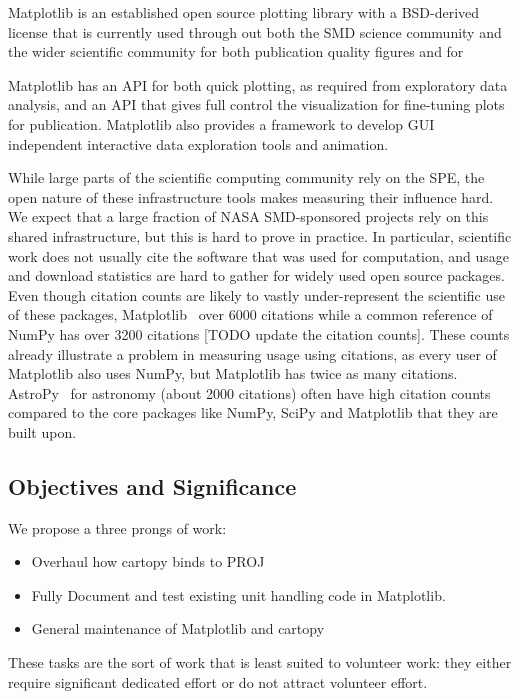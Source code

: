 \documentclass[12pt]{article}
\numberwithin{page}{section}
\begin{document}
Matplotlib \cite{Hunter:2007} is an established open source plotting
library with a BSD-derived license that is currently used through out
both the SMD science community and the wider scientific community for
both publication quality figures and for

Matplotlib has an API for both quick plotting, as required from
exploratory data analysis, and an API that gives full control the
visualization for fine-tuning plots for publication.  Matplotlib also
provides a framework to develop GUI independent interactive data
exploration tools and animation.

While large parts of the scientific computing community rely on the
SPE, the open nature of these infrastructure tools makes measuring
their influence hard.  We expect that a large fraction of NASA
SMD-sponsored projects rely on this shared infrastructure, but this is
hard to prove in practice.  In particular, scientific work does not
usually cite the software that was used for computation, and usage and
download statistics are hard to gather for widely used open source
packages.  Even though citation counts are likely to vastly
under-represent the scientific use of these packages,
Matplotlib~\cite{Hunter:2007} over 6000 citations while a
common reference of NumPy\cite{walt2011numpy} has over 3200 citations
[TODO update the citation counts]. These counts already illustrate a
problem in measuring usage using citations, as every user of
Matplotlib also uses NumPy, but Matplotlib has twice as
many citations.   AstroPy~\cite{robitaille2013astropy} for
astronomy (about 2000 citations) often have high citation counts
compared to the core packages like NumPy, SciPy and Matplotlib that
they are built upon.


\subsection{Objectives and Significance}
We propose a three prongs of work:

\begin{itemize}
\item Overhaul how cartopy binds to PROJ
\item Fully Document and test existing unit handling code in Matplotlib.
\item General maintenance of Matplotlib and cartopy
\end{itemize}

These tasks are the sort of work that is least suited to volunteer
work: they either require significant dedicated effort or do not
attract volunteer effort.
\end{document}
